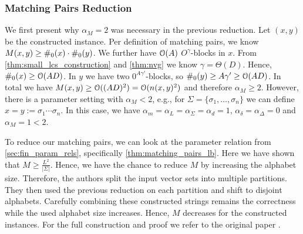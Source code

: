 \subsubsection{Matching Pairs Reduction}
\label{sec:small_lcs:matching_pairs_reduction}

We first present why $\alpha_M = 2$ was necessary in the previous reduction.
Let $(x,y)$ be the constructed \lcs{} instance.
Per definition of matching pairs, we know $M(x,y) \geq \#_{0}(x) \cdot \#_{0}(y)$.
We further have $\mathcal{O}(A)$ $O^\gamma$-blocks in $x$.
From \autoref{thm:small_lcs_construction} and \ref{thm:nvg} we know $\gamma = \Theta(D)$. 
Hence, $\#_{0}(x) \geq \mathcal{O}(AD)$.
In $y$ we have two $0^{A\gamma'}$-blocks, so $\#_{0}(y) \geq A\gamma' \geq \mathcal{O}(AD)$. %
In total we have $M(x,y) \geq \mathcal{O}((AD)^2) = \mathcal{O}(n(x,y)^2)$ and therefore $\alpha_M \geq 2$.
However, there is a parameter setting with $\alpha_M < 2$, e.g., for $\Sigma = \{ \sigma_1, \ldots, \sigma_n \}$ we can define $x = y := \sigma_1 \cdots \sigma_n$.
In this case, we have $\alpha_m = \alpha_L = \alpha_\Sigma = \alpha_d = 1$, $\alpha_\delta = \alpha_\Delta = 0$ and $\alpha_M = 1 < 2$.


To reduce our matching pairs, we can look at the parameter relation from \autoref{sec:fin_param_rels}, specifically \autoref{thm:matching_pairs_lb}.
Here we have shown that $M \geq \frac{L^2}{|\Sigma|}$.
Hence, we have the chance to reduce $M$ by increasing the alphabet size.
Therefore, the authors split the input vector sets into multiple partitions.
They then used the previous reduction on each partition and shift to disjoint alphabets.
Carefully combining these constructed strings remains the correctness while the used alphabet size increases.
Hence, $M$ decreases for the constructed instances.
For the full construction and proof we refer to the original paper \cite[Section 9.1.3]{Bringman.2018}.
